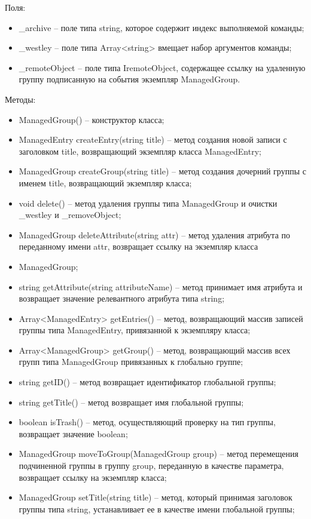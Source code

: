 Поля:
\begin{itemize}
  \item \_archive – поле типа string, которое содержит индекс выполняемой команды;
  \item \_westley – поле типа Array<string> вмещает набор аргументов команды;
  \item \_remoteObject – поле типа IremoteObject, содержащее ссылку на удаленную группу подписанную на события экземпляр ManagedGroup.
\end{itemize}

Методы:
\begin{itemize}
  \item ManagedGroup() – конструктор класса;
  \item ManagedEntry createEntry(string title) – метод создания новой записи с заголовком title, возвращающий экземпляр класса ManagedEntry;
  \item ManagedGroup createGroup(string title) – метод создания дочерний группы с именем title, возвращающий экземпляр класса;
  \item void delete() – метод удаления группы типа ManagedGroup и очистки \_westley и \_removeObject;
  \item ManagedGroup deleteAttribute(string attr) – метод удаления атрибута по переданному имени attr, возвращает ссылку на экземпляр класса
  \item ManagedGroup;
  \item string getAttribute(string attributeName) – метод принимает имя атрибута и возвращает значение релевантного атрибута типа string;
  \item Array<ManagedEntry> getEntries() – метод, возвращающий массив записей группы типа ManagedEntry, привязанной к экземпляру класса;
  \item Array<ManagedGroup> getGroup() – метод, возвращающий массив всех групп типа ManagedGroup привязанных к глобально группе;
  \item string getID() – метод возвращает идентификатор глобальной группы;
  \item string getTitle() – метод возвращает имя глобальной группы;
  \item boolean isTrash() – метод, осуществляющий проверку на тип группы, возвращает значение boolean;
  \item ManagedGroup moveToGroup(ManagedGroup group) – метод перемещения подчиненной группы в группу group, переданную в качестве параметра, возвращает ссылку на экземпляр класса;
  \item ManagedGroup setTitle(string title) – метод, который принимая заголовок группы типа string, устанавливает ее в качестве имени глобальной группы;

\end{itemize}

